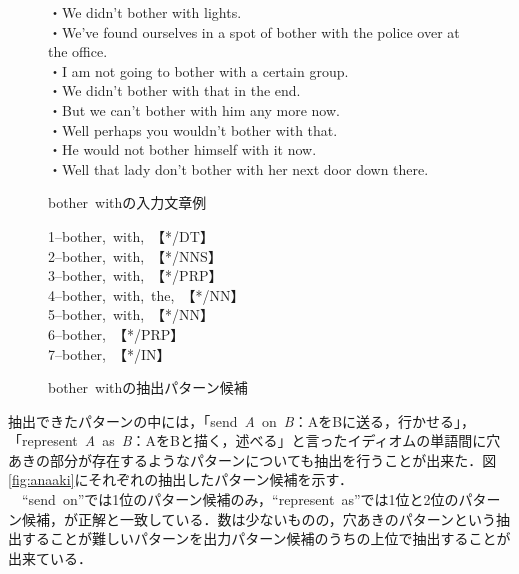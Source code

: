 \documentclass[12pt,twoside, fleqn]{ujbook}
\begin{document}
	\begin{figure}[htbp]
	\begin{screen}
		・We didn't bother with lights.\\
		・We've found ourselves in a spot of bother with the police over at the office.\\
		・I am not going to bother with a certain group.\\
		・We didn't bother with that in the end.\\
		・But we can't bother with him any more now.\\
		・Well perhaps you wouldn't bother with that.\\
		・He would not bother himself with it now.\\
		・Well that lady don't bother with her next door down there.
	\end{screen}
	\caption{bother\ withの入力文章例}
	\label{fig:bother_in}
	\end{figure}


	\begin{figure}[htbp]
	\begin{center}
	\begin{minipage}{0.6\hsize}
	\begin{center}
	\begin{shadebox}
		1--bother,\ with,\ 【*/DT】 \\
		2--bother,\ with,\ 【*/NNS】 \\
		3--bother,\ with,\ 【*/PRP】 \\
		4--bother,\ with,\ the,\ 【*/NN】 \\
		5--bother,\ with,\ 【*/NN】 \\
		6--bother,\ 【*/PRP】 \\
		7--bother,\ 【*/IN】
	\end{shadebox}
	\end{center}
	\end{minipage}
	\end{center}
	\caption{bother\ withの抽出パターン候補}
	\label{fig:bother_out}
	\end{figure}

	\newpage
	抽出できたパターンの中には，「send\ {\it A}\ on\ {\it B}：AをBに送る，行かせる」，「represent\ {\it A}\ as\ {\it B}：AをBと描く，述べる」と言ったイディオムの単語間に穴あきの部分が存在するようなパターンについても抽出を行うことが出来た．図\ref{fig:anaaki}にそれぞれの抽出したパターン候補を示す．\\
	　``send\ on''では1位のパターン候補のみ，``represent\ as''では1位と2位のパターン候補，が正解と一致している．数は少ないものの，穴あきのパターンという抽出することが難しいパターンを出力パターン候補のうちの上位で抽出することが出来ている．\\
\end{document}
